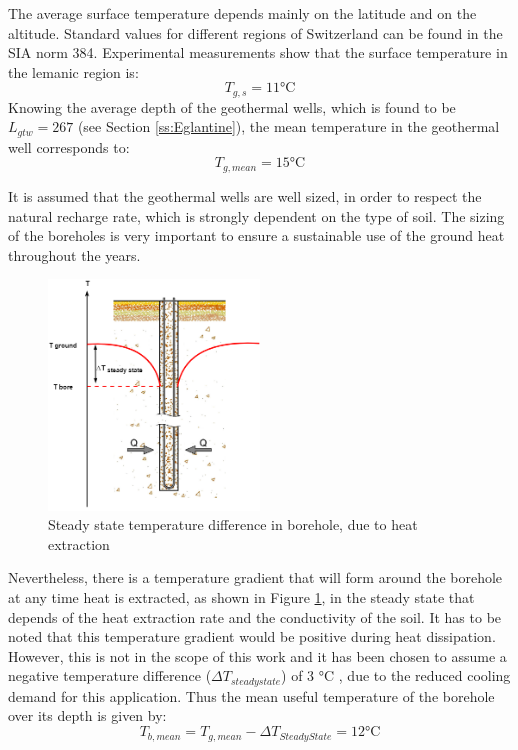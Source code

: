 \documentclass{article}
\begin{document}
The average surface temperature depends mainly on the latitude and on the altitude. Standard values for different regions of Switzerland can be found in the SIA norm 384\cite{siaSIA384Sondes2010}. Experimental measurements\cite{gadzEvaluationPotentielGeothermique2011} show that the surface temperature in the lemanic region is:
\begin{equation}
	T_{g,s} = 11 \si{\celsius}
\end{equation}
Knowing the average depth of the geothermal wells, which is found to be $L_{gtw} = 267$ (see Section \ref{ss:Eglantine}), the mean temperature in the geothermal well corresponds to:
\begin{equation}
	T_{g, mean} = 15 \si{\celsius}
\end{equation}

It is assumed that the geothermal wells are well sized, in order to respect the natural recharge rate, which is strongly dependent on the type of soil. The sizing of the boreholes is very important to ensure a sustainable use of the ground heat throughout the years. \\

\begin{figure}[htp]
	\centering
	\includegraphics[width=0.5\textwidth]{GTW_T_profile.png}
	\caption{Steady state temperature difference in borehole, due to heat extraction}
	\label{fig:GTW_T}
\end{figure}

Nevertheless, there is a temperature gradient that will form around the borehole at any time heat is extracted, as shown in Figure \ref{fig:GTW_T}, in the steady state that depends of the heat extraction rate and the conductivity of the soil. It has to be noted that this temperature gradient would be positive during heat dissipation. However, this is not in the scope of this work and it has been chosen to assume a negative temperature difference ($\Delta T_{steady state}$) of 3 \si{\celsius} \cite{guoTechnoeconomicComparisonDirect2012,hanSensitivityAnalysisVertical2016}, due to the reduced cooling demand for this application.
Thus the mean useful temperature of the borehole over its depth is given by:
\begin{equation}
	T_{b, mean} = T_{g, mean} -\Delta T_{Steady State} = 12 \si{\celsius}
\end{equation}
\end{document}

